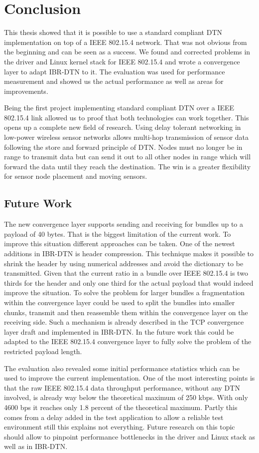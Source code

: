 \chapter{Conclusion}
This thesis showed that it is possible to use a standard compliant DTN
implementation on top of a IEEE 802.15.4 network. That was not obvious from the
beginning and can be seen as a success. We found and corrected problems in the
driver and Linux kernel stack for IEEE 802.15.4 and wrote a convergence layer to
adapt IBR-DTN to it. The evaluation was used for performance measurement and
showed us the actual performance as well as areas for improvements.

Being the first project implementing standard compliant DTN over a IEEE 802.15.4
link allowed us to proof that both technologies can work together. This opens up
a complete new field of research. Using delay tolerant networking in low-power
wireless sensor networks allows multi-hop transmission of sensor data following
the store and forward principle of DTN. Nodes must no longer be in range to
transmit data but can send it out to all other nodes in range which will forward
the data until they reach the destination. The win is a greater flexibility for
sensor node placement and moving sensors.

\section{Future Work}
The new convergence layer supports sending and receiving for bundles up to a
payload of 40 bytes. That is the biggest limitation of the current work. To
improve this situation different approaches can be taken. One of the newest
additions in IBR-DTN is header compression. This technique makes it possible to
shrink the header by using numerical addresses and avoid the dictionary to be
transmitted. Given that the current ratio in a bundle over IEEE 802.15.4 is two
thirds for the header and only one third for the actual payload that would indeed
improve the situation. To solve the problem for larger bundles a fragmentation
within the convergence layer could be used to split the bundles into smaller
chunks, transmit and then reassemble them within the convergence layer on the
receiving side. Such a mechanism is already described in the TCP convergence
layer draft \cite{tcp-clayer-draft} and implemented in IBR-DTN. In the future
work this could be adapted to the IEEE 802.15.4 convergence layer to fully
solve the problem of the restricted payload length.

The evaluation also revealed some initial performance statistics which can be
used to improve the current implementation. One of the most interesting points
is that the raw IEEE 802.15.4 data throughput performance, without any DTN
involved, is already way below the theoretical maximum of 250 kbps. With only
4600 bps it reaches only 1.8 percent of the theoretical maximum. Partly this
comes from a delay added in the test application to allow a reliable test
environment still this explains not everything. Future research on this topic
should allow to pinpoint performance bottlenecks in the driver and Linux stack
as well as in IBR-DTN.
